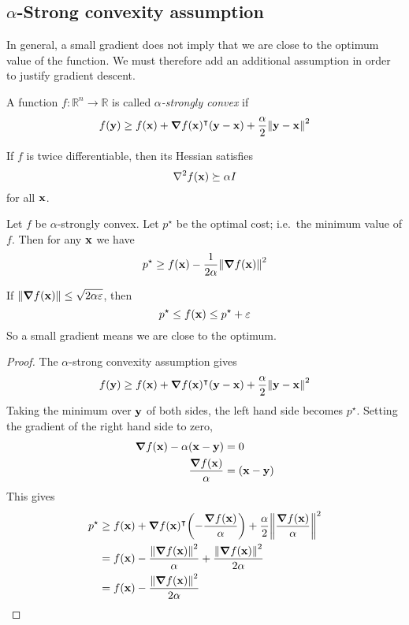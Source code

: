 \subsection{\(\alpha\)-Strong convexity assumption}
In general, a small gradient does not imply that we are close to the optimum value of the function.
We must therefore add an additional assumption in order to justify gradient descent.
\begin{definition}
	A function \(f \colon \mathbb R^n \to \mathbb R\) is called \textit{\(\alpha\)-strongly convex} if
	\[
		f(\vb y) \geq f(\vb x) + \grad{f(\vb x)}^\intercal (\vb y - \vb x) + \frac{\alpha}{2}\norm{\vb y - \vb x}^2
	\]
\end{definition}
\noindent If \(f\) is twice differentiable, then its Hessian satisfies
\[
	\laplacian{f(\vb x)} \succeq \alpha I
\]
for all \(\vb x\).
\begin{claim}
	Let \(f\) be \(\alpha\)-strongly convex.
	Let \(p^\star\) be the optimal cost; i.e.\ the minimum value of \(f\).
	Then for any \(\vb x\) we have
	\[
		p^\star \geq f(\vb x) - \frac{1}{2\alpha}\norm{\grad{f(\vb x)}}^2
	\]
\end{claim}
\begin{remark}
	If \(\norm{\grad{f(\vb x)}} \leq \sqrt{2\alpha\varepsilon}\), then
	\[
		p^\star \leq f(\vb x) \leq p^\star + \varepsilon
	\]
	So a small gradient means we are close to the optimum.
\end{remark}
\begin{proof}
	The \(\alpha\)-strong convexity assumption gives
	\[
		f(\vb y) \geq f(\vb x) + \grad{f(\vb x)}^\intercal (\vb y - \vb x) + \frac{\alpha}{2}\norm{\vb y - \vb x}^2
	\]
	Taking the minimum over \(\vb y\) of both sides, the left hand side becomes \(p^\star\).
	Setting the gradient of the right hand side to zero,
	\begin{align*}
		\grad{f(\vb x)} - \alpha (\vb x - \vb y) & = 0               \\
		\frac{\grad{f(\vb x)}}{\alpha}           & = (\vb x - \vb y) \\
	\end{align*}
	This gives
	\begin{align*}
		p^\star & \geq f(\vb x) + \grad{f(\vb x)}^\intercal \qty(-\frac{\grad{f(\vb x)}}{\alpha}) + \frac{\alpha}{2}\norm{\frac{\grad{f(\vb x)}}{\alpha}}^2 \\
		        & = f(\vb x) - \frac{\norm{\grad{f(\vb x)}}^2}{\alpha} + \frac{\norm{\grad{f(\vb x)}}^2}{2\alpha}                                            \\
		        & = f(\vb x) - \frac{\norm{\grad{f(\vb x)}}^2}{2\alpha}
	\end{align*}
\end{proof}
